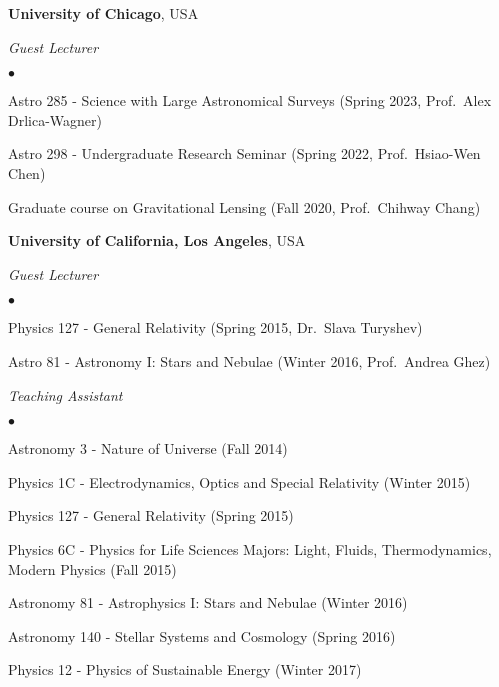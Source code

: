 \documentclass[margin, line]{res}
\newenvironment{list2}{
  \begin{list}{$\bullet$}{%
      \setlength{\itemsep}{0in}
      \setlength{\parsep}{0in} \setlength{\parskip}{0in}
      \setlength{\topsep}{0in} \setlength{\partopsep}{0in} 
      \setlength{\leftmargin}{0.2in}}}{\end{list}}
\begin{document}
\begin{resume}
{\bf University of Chicago}, USA

{\em Guest Lecturer} \hfill {\bf}\\
\begin{list2}
	\item Astro 285 - Science with Large Astronomical Surveys (Spring 2023, Prof.~Alex Drlica-Wagner)
	\item Astro 298 - Undergraduate Research Seminar (Spring 2022, Prof.~Hsiao-Wen Chen)
 	\item Graduate course on Gravitational Lensing (Fall 2020, Prof.~Chihway Chang)
\end{list2}
	
	
{\bf University of California, Los Angeles}, USA



{\em Guest Lecturer} \hfill {\bf}\\
\begin{list2}
	\item Physics 127 - General Relativity (Spring 2015, Dr.~Slava Turyshev)
	\item Astro 81 - Astronomy I: Stars and Nebulae (Winter 2016, Prof.~Andrea Ghez)
\end{list2}
	
{\em Teaching Assistant} \hfill {}\\
\begin{list2}
	\item Astronomy 3 - Nature of Universe (Fall 2014)
	\item Physics 1C - Electrodynamics, Optics and Special Relativity (Winter 2015)
	\item Physics 127 - General Relativity (Spring 2015)
	\item Physics 6C - Physics for Life Sciences Majors: Light, Fluids, Thermodynamics, Modern Physics (Fall 2015)
	\item Astronomy 81 - Astrophysics I: Stars and Nebulae (Winter 2016)
	\item Astronomy 140 - Stellar Systems and Cosmology (Spring 2016)
	\item Physics 12 - Physics of Sustainable Energy (Winter 2017)
\end{list2}



\end{resume}
\end{document}
